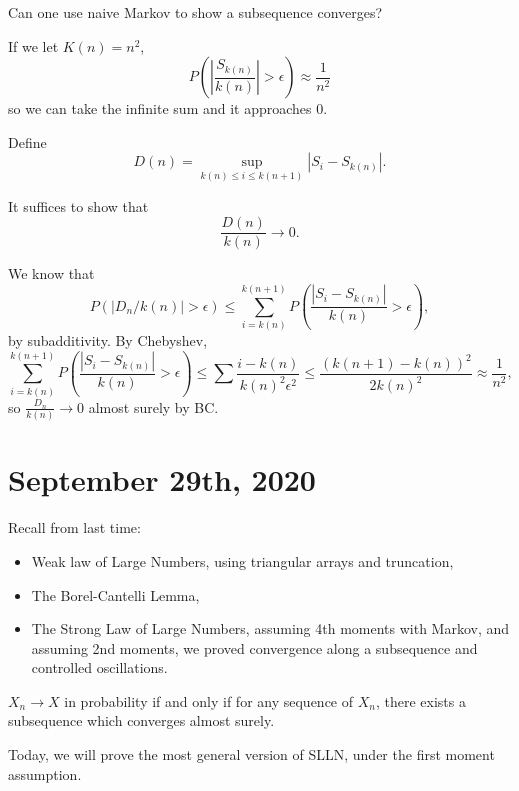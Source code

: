 \documentclass[11pt]{scrartcl}
\begin{document}
Can one use naive Markov to show a subsequence converges?  

If we let $K(n) = n^2$, 
$$P(|\frac{S_{k(n)}}{k(n)} |> \epsilon) \approx \frac{1}{n^2}$$
so we can take the infinite sum and it approaches $0$. 

Define $$D(n) = \sup_{k(n) \le i \le k(n+1)} |S_i - S_{k(n)}|.$$

It suffices to show that $$\frac{D(n)}{k(n)} \rightarrow 0.$$

We know that 
$$P(|D_n/k(n)| > \epsilon) \le \sum_{i=k(n)}^{k(n+1)}P\left (\frac{|S_i - S_{k(n)}|}{k(n)}> \epsilon\right ),$$
by subadditivity.  By Chebyshev,
$$\sum_{i=k(n)}^{k(n+1)}P\left (\frac{|S_i - S_{k(n)}|}{k(n)}> \epsilon\right ) \le \sum\frac{i-k(n)}{k(n)^2 \epsilon^2} \le \frac{(k(n+1) - k(n))^2}{2k(n)^2} \approx  \frac{1}{n^2} ,$$
so $\frac{D_n}{k(n)} \rightarrow 0$ almost surely by BC.
\pagebreak
\section{September 29th, 2020}
Recall from last time:
\begin{itemize}
\item Weak law of Large Numbers, using triangular arrays and truncation,
\item The Borel-Cantelli Lemma,
\item The Strong Law of Large Numbers, assuming 4th moments with Markov, and assuming 2nd moments, we proved convergence along a subsequence and controlled oscillations.
\end{itemize}
\begin{fact} $X_n \rightarrow X$ in probability if and only if for any sequence of $X_n$, there exists a subsequence which converges almost surely.
\end{fact}
Today, we will prove the most general version of SLLN, under the first moment assumption.
\end{document}
